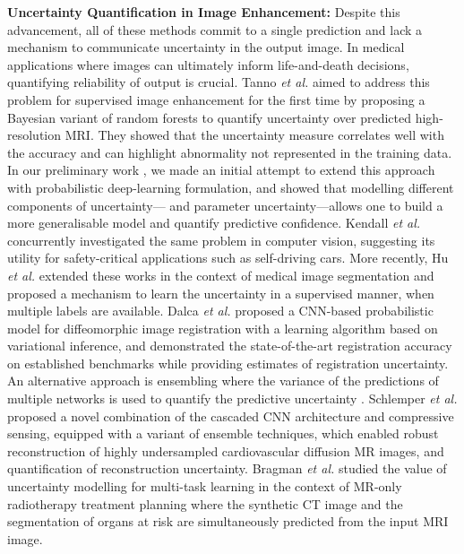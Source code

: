\textbf{Uncertainty Quantification in Image Enhancement:}
Despite this advancement, all of these methods commit to a single prediction and lack a mechanism to communicate uncertainty in the output image.  In medical applications where images can ultimately inform life-and-death decisions, quantifying reliability of output is crucial. Tanno \emph{et al.} \cite{tanno2016bayesian} aimed to address this problem for supervised image enhancement for the first time by proposing a Bayesian variant of random forests to quantify uncertainty over predicted high-resolution MRI. They showed that the uncertainty measure correlates well with the accuracy and can highlight abnormality not represented in the training data. In our preliminary work \cite{tanno2017bayesian}, we made an initial attempt
to extend this approach with probabilistic deep-learning formulation, and showed that modelling different components of uncertainty--- and parameter uncertainty---allows one to build a more generalisable model and quantify predictive confidence. Kendall \emph{et al.} \cite{kendall2017uncertainties} concurrently investigated the same problem in computer vision, suggesting its utility for safety-critical applications such as self-driving cars. More recently, Hu \emph{et al.}\cite{hu2019uncertainty} extended these works in the context of medical image segmentation and proposed a mechanism to learn the  uncertainty in a supervised manner, when multiple labels are available. Dalca \emph{et al.} \cite{dalca2018unsupervised} proposed a CNN-based probabilistic model for diffeomorphic image registration with a learning algorithm based on variational inference, and demonstrated the state-of-the-art registration accuracy on established benchmarks while providing estimates of registration uncertainty. An alternative approach is ensembling where the variance of the predictions of multiple networks is used to quantify the predictive uncertainty \cite{lakshminarayanan2017simple}. Schlemper \emph{et al.} \cite{schlemper2018stochastic} proposed a novel combination of the cascaded CNN architecture and compressive sensing, equipped with a variant of ensemble techniques, which enabled robust reconstruction of highly undersampled cardiovascular diffusion MR images, and quantification of reconstruction uncertainty. Bragman \emph{et al.} \cite{bragman2018uncertainty} studied the value of uncertainty modelling for multi-task learning in the context of MR-only radiotherapy treatment planning where the synthetic CT image and the segmentation of organs at risk are simultaneously predicted from the input MRI image.  

